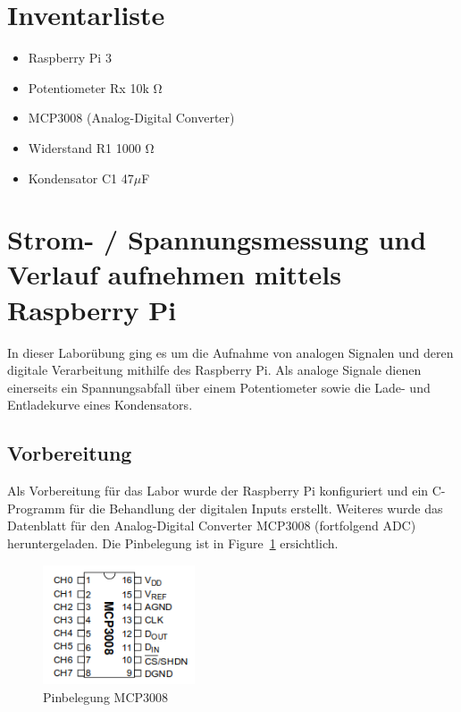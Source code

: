 \documentclass{article}
\begin{document}
\tableofcontents

\newpage
\section{Inventarliste}
  \begin{itemize}
    \item Raspberry Pi 3
    \item Potentiometer Rx 10k \si{\ohm}
    \item MCP3008 (Analog-Digital Converter)
    \item Widerstand R1 1000 \si{\ohm}
    \item Kondensator C1 47$\mu$F
  \end{itemize}

\newpage
\section{Strom- / Spannungsmessung und Verlauf aufnehmen mittels Raspberry Pi}
In dieser Laborübung ging es um die Aufnahme von analogen Signalen und deren digitale Verarbeitung mithilfe des Raspberry Pi.
Als analoge Signale dienen einerseits ein Spannungsabfall über einem Potentiometer sowie die Lade- und Entladekurve eines Kondensators.

\subsection{Vorbereitung}
Als Vorbereitung für das Labor wurde der Raspberry Pi konfiguriert und ein C-Programm für die Behandlung der digitalen Inputs erstellt.
Weiteres wurde das Datenblatt für den Analog-Digital Converter MCP3008 (fortfolgend ADC) heruntergeladen.
Die Pinbelegung ist in Figure~\ref{fig:ADCPinbelegung} ersichtlich.

\begin{figure}[h!]
    \centering
    \includegraphics[width=0.4\textwidth]{MCP3008-Pinbelegung.png}
    \caption{Pinbelegung MCP3008}
    \label{fig:ADCPinbelegung}
\end{figure}
\end{document}
